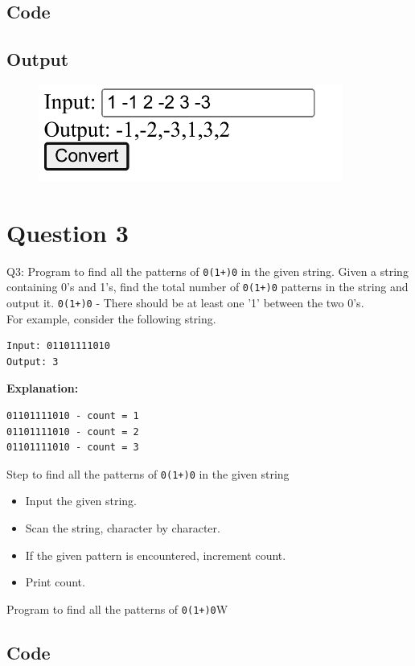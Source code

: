 \documentclass{article}
\begin{document}
\subsection*{Code}

\newpage
\subsection*{Output}
\begin{figure}[H]
    \centering
    \includegraphics[width=10cm]{2/out.png}
\end{figure}

\newpage
\section*{Question 3}
Q3: Program to find all the patterns of \lstinline{0(1+)0} in the given string.
Given a string containing 0's and 1's, find the total number of \lstinline{0(1+)0}
patterns in the string and output it.
\lstinline{0(1+)0} - There should be at least one '1' between the two 0's. \\
For example, consider the following string.
\begin{lstlisting}
Input: 01101111010
Output: 3
\end{lstlisting}
\textbf{Explanation:}
\begin{lstlisting}
01101111010 - count = 1
01101111010 - count = 2
01101111010 - count = 3
\end{lstlisting}
Step to find all the patterns of \lstinline{0(1+)0} in the given string
\begin{itemize}
    \item Input the given string.
    \item Scan the string, character by character.
    \item If the given pattern is encountered, increment count.
    \item Print count.
\end{itemize}
Program to find all the patterns of \lstinline{0(1+)0}W
\subsection*{Code}

\newpage
\end{document}
